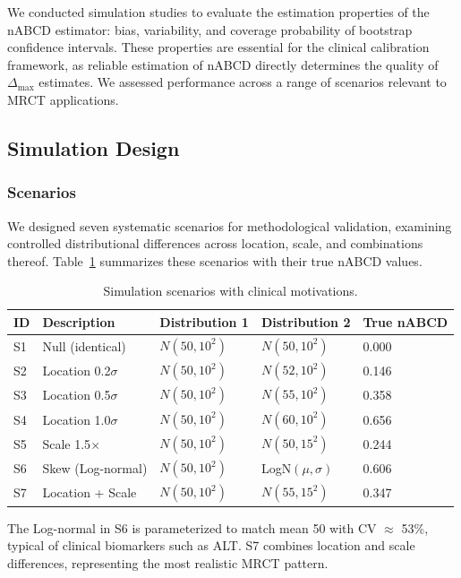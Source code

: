 \documentclass[AMA,Times1COL]{WileyNJDv5}
\begin{document}
We conducted simulation studies to evaluate the estimation properties of the nABCD estimator: bias, variability, and coverage probability of bootstrap confidence intervals. These properties are essential for the clinical calibration framework, as reliable estimation of nABCD directly determines the quality of $\Delta_{\max}$ estimates. We assessed performance across a range of scenarios relevant to MRCT applications.

\subsection{Simulation Design}\label{sec:sim_design}

\subsubsection{Scenarios}

We designed seven systematic scenarios for methodological validation, examining controlled distributional differences across location, scale, and combinations thereof. Table~\ref{tab:scenarios} summarizes these scenarios with their true nABCD values.

\begin{table}[ht]
\centering
\caption{Simulation scenarios with clinical motivations.\label{tab:scenarios}}
\begin{tabular}{lllll}
\toprule
\textbf{ID} & \textbf{Description} & \textbf{Distribution 1} & \textbf{Distribution 2} & \textbf{True nABCD} \\
\midrule
S1 & Null (identical) & $N(50, 10^2)$ & $N(50, 10^2)$ & 0.000 \\
S2 & Location 0.2$\sigma$ & $N(50, 10^2)$ & $N(52, 10^2)$ & 0.146 \\
S3 & Location 0.5$\sigma$ & $N(50, 10^2)$ & $N(55, 10^2)$ & 0.358 \\
S4 & Location 1.0$\sigma$ & $N(50, 10^2)$ & $N(60, 10^2)$ & 0.656 \\
S5 & Scale 1.5$\times$ & $N(50, 10^2)$ & $N(50, 15^2)$ & 0.244 \\
S6 & Skew (Log-normal) & $N(50, 10^2)$ & LogN$(\mu, \sigma)$ & 0.606 \\
S7 & Location + Scale & $N(50, 10^2)$ & $N(55, 15^2)$ & 0.347 \\
\bottomrule
\end{tabular}
\begin{tablenotes}
\item The Log-normal in S6 is parameterized to match mean 50 with CV $\approx$ 53\%, typical of clinical biomarkers such as ALT. S7 combines location and scale differences, representing the most realistic MRCT pattern.
\end{tablenotes}
\end{table}
\end{document}
